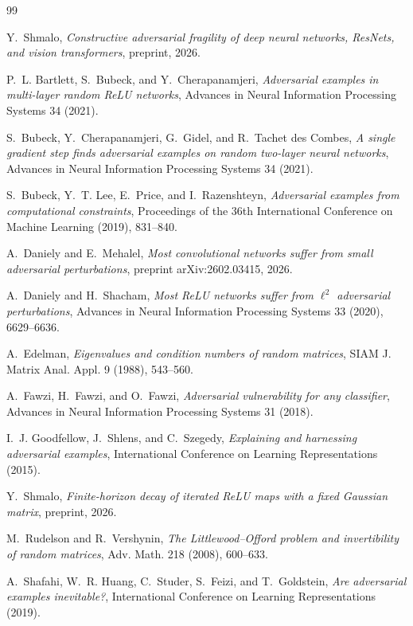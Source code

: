 \begin{thebibliography}{99}

Y.~Shmalo,
\emph{Constructive adversarial fragility of deep neural networks, ResNets, and vision transformers},
preprint, 2026.

P.~L. Bartlett, S.~Bubeck, and Y.~Cherapanamjeri,
\emph{Adversarial examples in multi-layer random ReLU networks},
Advances in Neural Information Processing Systems 34 (2021).

S.~Bubeck, Y.~Cherapanamjeri, G.~Gidel, and R.~Tachet des Combes,
\emph{A single gradient step finds adversarial examples on random two-layer neural networks},
Advances in Neural Information Processing Systems 34 (2021).

S.~Bubeck, Y.~T. Lee, E.~Price, and I.~Razenshteyn,
\emph{Adversarial examples from computational constraints},
Proceedings of the 36th International Conference on Machine Learning (2019), 831--840.

A.~Daniely and E.~Mehalel,
\emph{Most convolutional networks suffer from small adversarial perturbations},
preprint arXiv:2602.03415, 2026.

A.~Daniely and H.~Shacham,
\emph{Most ReLU networks suffer from $\ell^2$ adversarial perturbations},
Advances in Neural Information Processing Systems 33 (2020), 6629--6636.

A.~Edelman,
\emph{Eigenvalues and condition numbers of random matrices},
SIAM J. Matrix Anal. Appl. 9 (1988), 543--560.

A.~Fawzi, H.~Fawzi, and O.~Fawzi,
\emph{Adversarial vulnerability for any classifier},
Advances in Neural Information Processing Systems 31 (2018).

I.~J. Goodfellow, J.~Shlens, and C.~Szegedy,
\emph{Explaining and harnessing adversarial examples},
International Conference on Learning Representations (2015).

Y.~Shmalo,
\emph{Finite-horizon decay of iterated ReLU maps with a fixed Gaussian matrix},
preprint, 2026.

M.~Rudelson and R.~Vershynin,
\emph{The Littlewood--Offord problem and invertibility of random matrices},
Adv. Math. 218 (2008), 600--633.

A.~Shafahi, W.~R. Huang, C.~Studer, S.~Feizi, and T.~Goldstein,
\emph{Are adversarial examples inevitable?},
International Conference on Learning Representations (2019).


\end{thebibliography}

